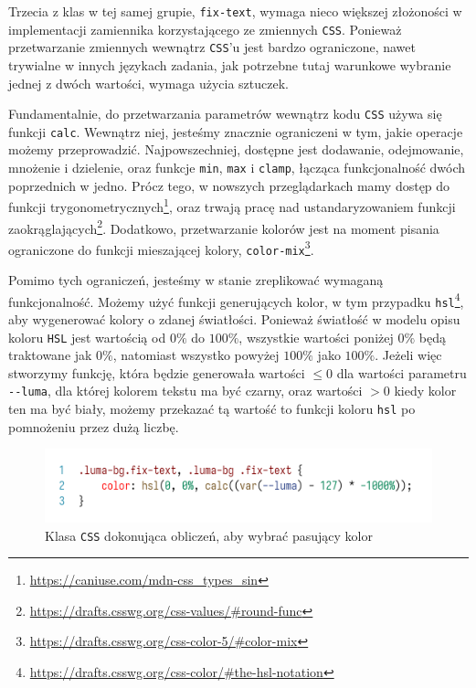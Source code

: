 \documentclass[licencjacka]{pracadypl}
\begin{document}
Trzecia z klas w tej samej grupie, \texttt{fix-text}, wymaga nieco większej złożoności w implementacji zamiennika korzystającego ze zmiennych \texttt{CSS}. Ponieważ przetwarzanie zmiennych wewnątrz \texttt{CSS}'u jest bardzo ograniczone, nawet trywialne w innych językach zadania, jak potrzebne tutaj warunkowe wybranie jednej z dwóch wartości, wymaga użycia sztuczek.

Fundamentalnie, do przetwarzania parametrów wewnątrz kodu \texttt{CSS} używa się funkcji \texttt{calc}. Wewnątrz niej, jesteśmy znacznie ograniczeni w tym, jakie operacje możemy przeprowadzić. Najpowszechniej, dostępne jest dodawanie, odejmowanie, mnożenie i dzielenie, oraz funkcje \texttt{min}, \texttt{max} i \texttt{clamp}, łącząca funkcjonalność dwóch poprzednich w jedno. Prócz tego, w nowszych przeglądarkach mamy dostęp do funkcji trygonometrycznych\footnote{\url{https://caniuse.com/mdn-css_types_sin}}, oraz trwają pracę nad ustandaryzowaniem funkcji zaokrąglających\footnote{\url{https://drafts.csswg.org/css-values/\#round-func}}. Dodatkowo, przetwarzanie kolorów jest na moment pisania ograniczone do funkcji mieszającej kolory, \texttt{color-mix}\footnote{\url{https://drafts.csswg.org/css-color-5/\#color-mix}}.

Pomimo tych ograniczeń, jesteśmy w stanie zreplikować wymaganą funkcjonalność. Możemy użyć funkcji generujących kolor, w tym przypadku \texttt{hsl}\footnote{\url{https://drafts.csswg.org/css-color/\#the-hsl-notation}}, aby wygenerować kolory o zdanej światłości. Ponieważ światłość w modelu opisu koloru \texttt{HSL} jest wartością od $0\%$ do $100\%$, wszystkie wartości poniżej $0\%$ będą traktowane jak $0\%$, natomiast wszystko powyżej $100\%$ jako $100\%$. Jeżeli więc stworzymy funkcję, która będzie generowała wartości $\leq 0$ dla wartości parametru \texttt{-\.-luma}, dla której kolorem tekstu ma być czarny, oraz wartości $> 0$ kiedy kolor ten ma być biały, możemy przekazać tą wartość to funkcji koloru \texttt{hsl} po pomnożeniu przez dużą liczbę.

\begin{figure}[H]
  \centering
  \includegraphics[width=\linewidth]{images/code-css-luma-calc.png}
  \caption{Klasa \texttt{CSS} dokonująca obliczeń, aby wybrać pasujący kolor}
  \label{fig:css-css-luma-calc}
\end{figure}
\end{document}
